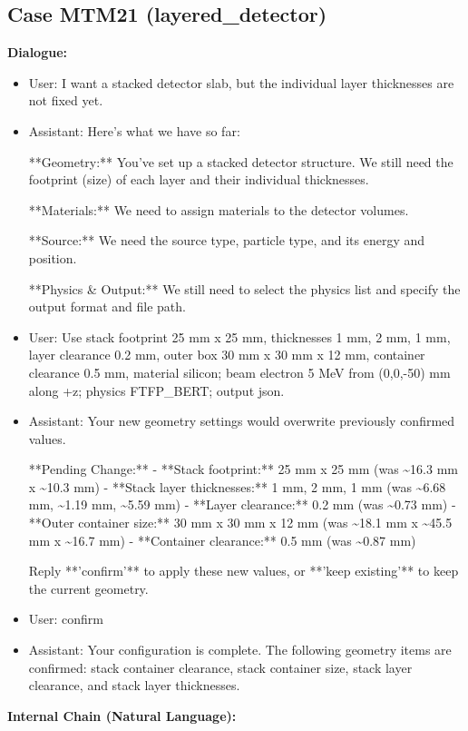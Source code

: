 \documentclass[11pt]{ctexart}
\begin{document}
\subsection{Case MTM21 (layered\_detector)}
\textbf{Dialogue:}
\begin{itemize}
\item User: I want a stacked detector slab, but the individual layer thicknesses are not fixed yet.
\item Assistant: Here's what we have so far:

**Geometry:** You've set up a stacked detector structure. We still need the footprint (size) of each layer and their individual thicknesses.

**Materials:** We need to assign materials to the detector volumes.

**Source:** We need the source type, particle type, and its energy and position.

**Physics \& Output:** We still need to select the physics list and specify the output format and file path.
\item User: Use stack footprint 25 mm x 25 mm, thicknesses 1 mm, 2 mm, 1 mm, layer clearance 0.2 mm, outer box 30 mm x 30 mm x 12 mm, container clearance 0.5 mm, material silicon; beam electron 5 MeV from (0,0,-50) mm along +z; physics FTFP\_BERT; output json.
\item Assistant: Your new geometry settings would overwrite previously confirmed values.

**Pending Change:**
- **Stack footprint:** 25 mm x 25 mm (was \textasciitilde{}16.3 mm x \textasciitilde{}10.3 mm)
- **Stack layer thicknesses:** 1 mm, 2 mm, 1 mm (was \textasciitilde{}6.68 mm, \textasciitilde{}1.19 mm, \textasciitilde{}5.59 mm)
- **Layer clearance:** 0.2 mm (was \textasciitilde{}0.73 mm)
- **Outer container size:** 30 mm x 30 mm x 12 mm (was \textasciitilde{}18.1 mm x \textasciitilde{}45.5 mm x \textasciitilde{}16.7 mm)
- **Container clearance:** 0.5 mm (was \textasciitilde{}0.87 mm)

Reply **'confirm'** to apply these new values, or **'keep existing'** to keep the current geometry.
\item User: confirm
\item Assistant: Your configuration is complete. The following geometry items are confirmed: stack container clearance, stack container size, stack layer clearance, and stack layer thicknesses.
\end{itemize}
\textbf{Internal Chain (Natural Language):}
\end{document}
